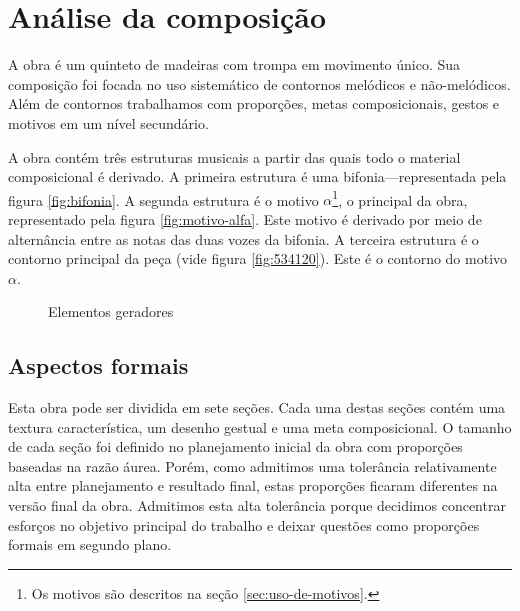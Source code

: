\chapter{Análise da composição}
\label{cha:anal-da-comp}

A obra \obra{} é um quinteto de madeiras com trompa em movimento
único. Sua composição foi focada no uso sistemático de contornos
melódicos e não-melódicos. Além de contornos trabalhamos com
proporções, metas composicionais, gestos e motivos em um nível
secundário.

A obra contém três estruturas musicais a partir das quais todo o
material composicional é derivado. A primeira estrutura é uma
bifonia---representada pela figura \ref{fig:bifonia}. A segunda
estrutura é o motivo $\alpha$\footnote{Os motivos são descritos na
  seção \ref{sec:uso-de-motivos}.}, o principal da obra, representado
pela figura \ref{fig:motivo-alfa}. Este motivo é derivado por meio de
alternância entre as notas das duas vozes da bifonia. A terceira
estrutura é o contorno principal da peça \contpr{} (vide figura
\ref{fig:534120}). Este é o contorno do motivo $\alpha$.

\begin{figure}
  \centering

  \caption{Elementos geradores}
  \label{fig:elementos-geradores}
\end{figure}

\section{Aspectos formais}
\label{sec:aspectos-formais}

Esta obra pode ser dividida em sete seções. Cada uma destas seções
contém uma textura característica, um desenho gestual e uma meta
composicional.
O tamanho de cada seção foi definido no planejamento inicial da obra
com proporções baseadas na razão áurea.
Porém, como admitimos uma tolerância relativamente alta entre
planejamento e resultado final, estas proporções ficaram diferentes na
versão final da obra. Admitimos esta alta tolerância porque decidimos
concentrar esforços no objetivo principal do trabalho e deixar
questões como proporções formais em segundo plano.

